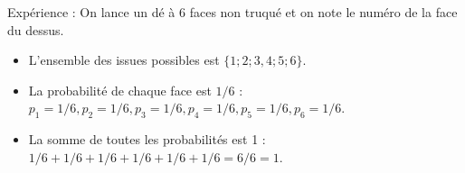 \begin{myex}
	Expérience : On lance un dé à 6 faces non truqué et on note le numéro de la face du dessus.
	
	\begin{itemize}
		\item L'ensemble des issues possibles est $\{1 ; 2 ; 3, 4 ; 5 ; 6\}$.
		\item La probabilité de chaque face est $1/6$ : \\
		 $p_1=1/6, p_2=1/6, p_3=1/6, p_4=1/6, p_5=1/6, p_6=1/6$.
		\item La somme de toutes les probabilités est 1 : \\
		$1/6 + 1/6 + 1/6 + 1/6 + 1/6 + 1/6 = 6/6 = 1$.
	\end{itemize}
\end{myex}